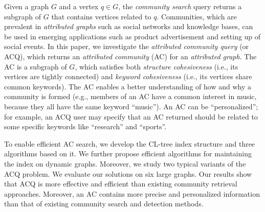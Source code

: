 Given a graph $G$ and a vertex $q \in G$, the {\it community search} query returns a subgraph of $G$ that contains vertices related to $q$. Communities, which are prevalent in {\it attributed graphs} such as social networks and knowledge bases, can be used in emerging applications such as product advertisement and setting up of social events.
In this paper, we investigate the {\it attributed community query} (or ACQ), which returns an {\it attributed community} (AC) for an {\it attributed graph}. The AC is a subgraph of $G$, which satisfies both {\it structure cohesiveness} (i.e., its vertices are tightly connected) and {\it keyword cohesiveness} (i.e., its vertices share common keywords).  The AC enables a better understanding of how and why a community is formed (e.g., members of an AC have a common interest in music, because they all have the same keyword ``music'').  An AC can be ``personalized''; for example, an ACQ user may specify that an AC returned should be related to some specific keywords like ``research'' and ``sports''.

To enable efficient AC search, we develop the CL-tree index structure and three algorithms based on it. We further propose efficient algorithms for maintaining the index on dynamic graphs. Moreover, we study two typical variants of the ACQ problem. We evaluate our solutions on six large graphs. Our results show that ACQ is more effective and efficient than existing community retrieval approaches. Moreover, an AC contains more precise and personalized information than that of existing community search and detection methods. 